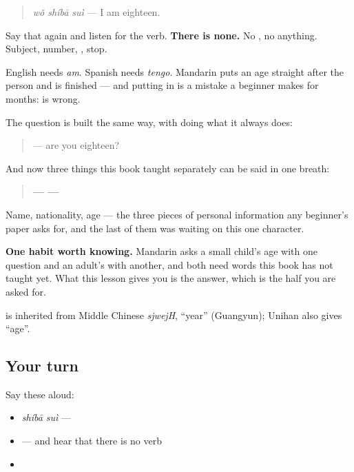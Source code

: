 \begin{grammarlens}[title={Grammar Lens: the sentence with no verb in it}]
\begin{quote}
\textbf{} \emph{wǒ shíbā suì} — I am eighteen.
\end{quote}

Say that again and listen for the verb. \textbf{There is none.} No , no anything. Subject, number, , stop.

English needs \emph{am}. Spanish needs \emph{tengo}. Mandarin puts an age straight after the person and is finished — and putting  in is a mistake a beginner makes for months: \emph{} is wrong.

The question is built the same way, with  doing what it always does:

\begin{quote}
\textbf{} — are you eighteen?
\end{quote}

And now three things this book taught separately can be said in one breath:

\begin{quote}
\textbf{ —  — }
\end{quote}

Name, nationality, age — the three pieces of personal information any beginner's paper asks for, and the last of them was waiting on this one character.

\textbf{One habit worth knowing.} Mandarin asks a small child's age with one question and an adult's with another, and both need words this book has not taught yet. What this lesson gives you is the answer, which is the half you are asked for.
\end{grammarlens}

\begin{cousinweb}
\textbf{} is inherited from Middle Chinese \emph{sjwejH}, \textquotedblleft{}year\textquotedblright{} (Guangyun); Unihan also gives \textquotedblleft{}age\textquotedblright{}.
\end{cousinweb}

\subsection*{Your turn}
Say these aloud:

\begin{itemize}
\raggedright
  \item \emph{shíbā suì} — 
  \item {} — and hear that there is no verb
  \item {}
\end{itemize}

